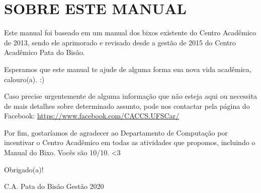 \section{SOBRE ESTE MANUAL}
Este manual foi baseado em um manual dos bixos existente do Centro Acadêmico de 2013, sendo ele aprimorado e revisado desde a gestão de 2015 do Centro Acadêmico Pata do Bisão.

Esperamos que este manual te ajude de alguma forma sua nova vida acadêmica, calouro(a). :)

Caso precise urgentemente de alguma informação que não esteja aqui ou necessita de mais detalhes sobre determinado assunto, pode nos contactar pela página do Facebook: \url{https://www.facebook.com/CACCS.UFSCar/}

Por fim, gostaríamos de agradecer ao Departamento de Computação por incentivar o Centro Acadêmico em todas as atividades que propomos, incluindo o Manual do Bixo. Vocês são 10/10. <3

\begin{flushright}
  Obrigado(a)!

  C.A. Pata do Bisão Gestão 2020
\end{flushright}
